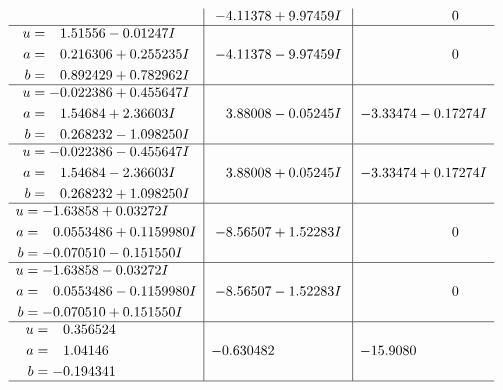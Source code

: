 \documentclass[1p]{elsarticle_modified}
\theoremstyle{definition}
\begin{document}
$$\begin{array}{c|c|c}
 & -4.11378 + 9.97459 I & \phantom{-0.000000 } 0 \\ \hline\begin{aligned}
u &= \phantom{-}1.51556 - 0.01247 I \\
a &= \phantom{-}0.216306 + 0.255235 I \\
b &= \phantom{-}0.892429 + 0.782962 I\end{aligned}
 & -4.11378 - 9.97459 I & \phantom{-0.000000 } 0 \\ \hline\begin{aligned}
u &= -0.022386 + 0.455647 I \\
a &= \phantom{-}1.54684 + 2.36603 I \\
b &= \phantom{-}0.268232 - 1.098250 I\end{aligned}
 & \phantom{-}3.88008 - 0.05245 I & -3.33474 - 0.17274 I \\ \hline\begin{aligned}
u &= -0.022386 - 0.455647 I \\
a &= \phantom{-}1.54684 - 2.36603 I \\
b &= \phantom{-}0.268232 + 1.098250 I\end{aligned}
 & \phantom{-}3.88008 + 0.05245 I & -3.33474 + 0.17274 I \\ \hline\begin{aligned}
u &= -1.63858 + 0.03272 I \\
a &= \phantom{-}0.0553486 + 0.1159980 I \\
b &= -0.070510 - 0.151550 I\end{aligned}
 & -8.56507 + 1.52283 I & \phantom{-0.000000 } 0 \\ \hline\begin{aligned}
u &= -1.63858 - 0.03272 I \\
a &= \phantom{-}0.0553486 - 0.1159980 I \\
b &= -0.070510 + 0.151550 I\end{aligned}
 & -8.56507 - 1.52283 I & \phantom{-0.000000 } 0 \\ \hline\begin{aligned}
u &= \phantom{-}0.356524\phantom{ +0.000000I} \\
a &= \phantom{-}1.04146\phantom{ +0.000000I} \\
b &= -0.194341\phantom{ +0.000000I}\end{aligned}
 & -0.630482\phantom{ +0.000000I} & -15.9080\phantom{ +0.000000I}\\
 \hline 
 \end{array}$$\newpage\newpage\renewcommand{\arraystretch}{1}
\end{document}
